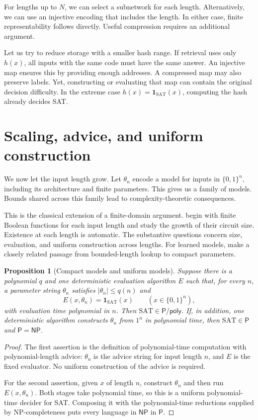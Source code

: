\documentclass[11pt,a4paper]{article}
\numberwithin{equation}{section}
\newcommand{\Pclass}{\mathsf{P}}
\newcommand{\NPclass}{\mathsf{NP}}
\newcommand{\Ppoly}{\mathsf{P/poly}}
\newcommand{\SAT}{\mathrm{SAT}}
\newcommand{\bits}{\{0,1\}}
\newcommand{\ind}{\mathbf{1}}
\theoremstyle{plain}
\newtheorem{proposition}[lemma]{Proposition}
\theoremstyle{definition}
\theoremstyle{remark}
\begin{document}
For lengths up to $N$, we can select a subnetwork for each length. Alternatively, we can use an injective encoding that includes the length. In either case, finite representability follows directly. Useful compression requires an additional argument.

Let us try to reduce storage with a smaller hash range. If retrieval uses only $h(x)$, all inputs with the same code must have the same answer. An injective map ensures this by providing enough addresses. A compressed map may also preserve labels. Yet, constructing or evaluating that map can contain the original decision difficulty. In the extreme case $h(x)=\ind_{\SAT}(x)$, computing the hash already decides SAT.

\section{Scaling, advice, and uniform construction}
\label{sec:uniformity}

We now let the input length grow. Let $\theta_n$ encode a model for inputs in $\bits^n$, including its architecture and finite parameters. This gives us a family of models. Bounds shared across this family lead to complexity-theoretic consequences.

This is the classical extension of a finite-domain argument. \citet{karp1982} begin with finite Boolean functions for each input length and study the growth of their circuit size. Existence at each length is automatic. The substantive questions concern size, evaluation, and uniform construction across lengths. For learned models, \citet[Sections~2.3--2.4 and~4.3]{lin2021limitations} make a closely related passage from bounded-length lookup to compact parameters.

\begin{proposition}[Compact models and uniform models]
\label{prop:advice}
Suppose there is a polynomial $q$ and one deterministic evaluation algorithm $E$ such that, for every $n$, a parameter string $\theta_n$ satisfies $|\theta_n|\leq q(n)$ and
\begin{equation}
E(x,\theta_n)=\ind_{\SAT}(x)\qquad(x\in\bits^n),
\end{equation}
with evaluation time polynomial in $n$. Then $\SAT\in\Ppoly$. If, in addition, one deterministic algorithm constructs $\theta_n$ from $1^n$ in polynomial time, then $\SAT\in\Pclass$ and $\Pclass=\NPclass$.
\end{proposition}

\begin{proof}
The first assertion is the definition of polynomial-time computation with polynomial-length advice: $\theta_n$ is the advice string for input length $n$, and $E$ is the fixed evaluator. No uniform construction of the advice is required.

For the second assertion, given $x$ of length $n$, construct $\theta_n$ and then run $E(x,\theta_n)$. Both stages take polynomial time, so this is a uniform polynomial-time decider for SAT. Composing it with the polynomial-time reductions supplied by NP-completeness puts every language in $\NPclass$ in $\Pclass$.
\end{proof}
\end{document}
